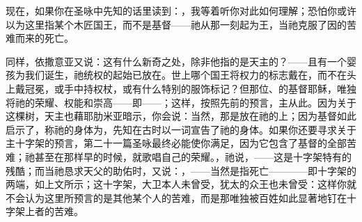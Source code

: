 现在，如果你在圣咏中先知的话里读到：，我等着听你对此如何理解；恐怕你或许以为这里指某个木匠国王，而不是基督——祂从那一刻起为王，当祂克服了因的苦难而来的死亡。\par

同样，依撒意亚又说：这有什么新奇之处，除非他指的是天主的？——且有一个婴孩为我们诞生，祂统权的起始已放在。世上哪个国王将权力的标志戴在，而不在头上戴冠冕，或手中持权杖，或有什么特别的服饰标记？但那位、的基督耶稣，唯独将祂的荣耀、权能和崇高——即——；这样，按照先前的预言，主从此。因为关于这棵树，天主也藉耶肋米亚暗示，你会说：当然，那是放在祂的上；因为基督如此启示了，称祂的身体为，先知在古时以一词宣告了祂的身体。如果你还要寻求关于主十字架的预言，第二十一篇圣咏最终必能使你满足，因为它包含了基督的全部苦难；祂甚至在那样早的时候，就歌唱自己的荣耀。，祂说，——这是十字架特有的残酷；而当祂恳求天父的助佑时，又说：，——当然是指死亡————即十字架的两端，如上文所示；这十字架，大卫本人未曾受，犹太的众王也未曾受：这样你就不会认为这里所预言的是其他某个人的苦难，而是那唯独被百姓如此显著地钉在十字架上者的苦难。\par

